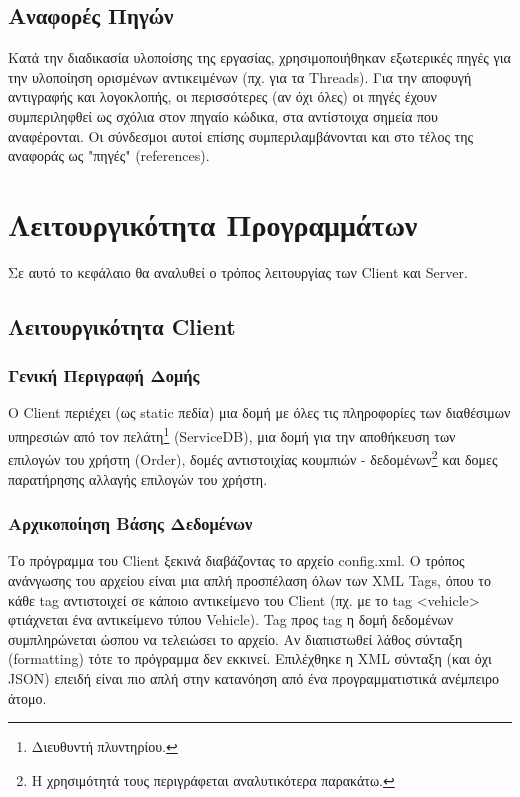     \section{Αναφορές Πηγών}
    \label{sec:SectionName1.4}
    Κατά την διαδικασία υλοποίσης της εργασίας, χρησιμοποιήθηκαν εξωτερικές πηγές για την υλοποίηση ορισμένων αντικειμένων (πχ. για τα Threads). Για την αποφυγή αντιγραφής και λογοκλοπής, οι περισσότερες (αν όχι όλες) οι πηγές έχουν συμπεριληφθεί ως σχόλια στον πηγαίο κώδικα, στα αντίστοιχα σημεία που αναφέρονται. Οι σύνδεσμοι αυτοί επίσης συμπεριλαμβάνονται και στο τέλος της αναφοράς ως "πηγές" (references).
    
\chapter{Λειτουργικότητα Προγραμμάτων}
\label{ch:ChapterName2}
Σε αυτό το κεφάλαιο θα αναλυθεί ο τρόπος λειτουργίας των Client και Server.

    \section{Λειτουργικότητα Client}
    \label{sec:SectionName2.1}
    
    
        \subsection{Γενική Περιγραφή Δομής} 
        \label{sec:SubSectionName2.1.1}
        Ο Client περιέχει (ως static πεδία) μια δομή με όλες τις πληροφορίες των διαθέσιμων υπηρεσιών από τον πελάτη\footnote{Διευθυντή πλυντηρίου.} (ServiceDB), μια δομή για την αποθήκευση των επιλογών του χρήστη (Order), δομές αντιστοιχίας κουμπιών - δεδομένων\footnote{Η χρησιμότητά τους περιγράφεται αναλυτικότερα παρακάτω.} και δομες παρατήρησης αλλαγής επιλογών του χρήστη.
        \newpage
        
        \subsection{Αρχικοποίηση Βάσης Δεδομένων}
        \label{sec:SubSectionName2.1.2}
        Το πρόγραμμα του Client ξεκινά διαβάζοντας το αρχείο config.xml. Ο τρόπος ανάνγωσης του αρχείου είναι μια απλή προσπέλαση όλων των XML Tags, όπου το κάθε tag αντιστοιχεί σε κάποιο αντικείμενο του Client (πχ. με το tag <vehicle> φτιάχνεται ένα αντικείμενο τύπου Vehicle). Tag προς tag η δομή δεδομένων συμπληρώνεται ώσπου να τελειώσει το αρχείο. Αν διαπιστωθεί λάθος σύνταξη (formatting) τότε το πρόγραμμα δεν εκκινεί. Επιλέχθηκε η XML σύνταξη (και όχι JSON) επειδή είναι πιο απλή στην κατανόηση από ένα προγραμματιστικά ανέμπειρο άτομο.
        
